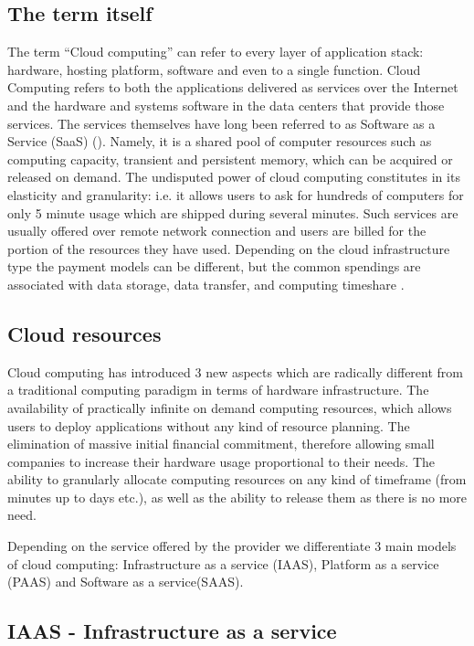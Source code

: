 \documentclass[licencjacka,en]{thesisclass}
\begin{document}
\subsection{The term itself}

The term “Cloud computing” can refer to every layer of application stack:
hardware, hosting platform, software and even to a single function.
Cloud Computing refers to both the applications delivered as services over the Internet and
the hardware and systems software in the data centers that provide those services.
The services themselves have long been referred to as Software as a Service (SaaS) (\cite{bib-cloud-armbrust}).
Namely, it is a shared pool of computer resources such as computing capacity,
transient and persistent memory, which can be acquired or released on demand.
The undisputed power of cloud computing constitutes in its elasticity and granularity:
i.e. it allows users to ask for hundreds of computers for only 5 minute usage which
are shipped during several minutes.
Such services are usually offered over remote network connection and users are billed
for the portion of the resources they have used.
Depending on the cloud infrastructure type the payment models can be different,
but the common spendings are associated with data storage, data transfer, and computing timeshare
\cite{bib-cloud-laatikainen}.

\subsection{Cloud resources}

Cloud computing has introduced 3 new aspects which are radically different from a traditional
computing paradigm in terms of hardware infrastructure. 
The availability of practically infinite on demand computing resources,
which allows users to deploy applications without any kind of resource planning.  
The elimination of massive initial financial commitment, therefore allowing small companies to increase
their hardware usage proportional to their needs.
The ability to granularly allocate computing resources on any kind of timeframe
(from minutes up to days etc.), as well as the ability to release them as there is no more need.

Depending on the service offered by the provider we differentiate 3 main models of cloud computing:
Infrastructure as a service (IAAS),
Platform as a service (PAAS) and
Software as a service(SAAS).

\subsection{IAAS - Infrastructure as a service}
\end{document}
